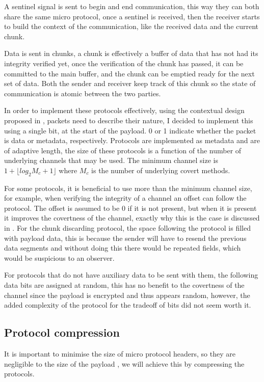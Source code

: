 A sentinel signal is sent to begin and end communication, this way they can both share the same micro protocol, once a sentinel is received, then the receiver starts to build the context of the communication, like the received data and the current chunk.

Data is sent in chunks, a chunk is effectively a buffer of data that has not had its integrity verified yet, once the verification of the chunk has passed, it can be committed to the main buffer, and the chunk can be emptied ready for the next set of data. Both the sender and receiver keep track of this chunk so the state of communication is atomic between the two parties.

In order to implement these protocols effectively, using the contextual design proposed in \citep{rfc1144}, packets need to describe their nature, I decided to implement this using a single bit, at the start of the payload. 0 or 1 indicate whether the packet is data or metadata, respectively. Protocols are implemented as metadata and are of adaptive length, the size of these protocols is a function of the number of underlying channels that may be used. The minimum channel size is $1 + \lfloor log_2{M_c + 1} \rfloor$ where $M_c$ is the number of underlying covert methods.

For some protocols, it is beneficial to use more than the minimum channel size, for example, when verifying the integrity of a channel an offset can follow the protocol. The offset is assumed to be 0 if it is not present, but when it is present it improves the covertness of the channel, exactly why this is the case is discussed in . For the chunk discarding protocol, the space following the protocol is filled with payload data, this is because the sender will have to resend the previous data segments and without doing this there would be repeated fields, which would be suspicious to an observer.

For protocols that do not have auxiliary data to be sent with them, the following data bits are assigned at random, this has no benefit to the covertness of the channel since the payload is encrypted and thus appears random, however, the added complexity of the protocol for the tradeoff of bits did not seem worth it.


\subsection{Protocol compression}

It is important to minimise the size of micro protocol headers, so they are negligible to the size of the payload \citep{DRiCCBoCP}, we will achieve this by compressing the protocols.

